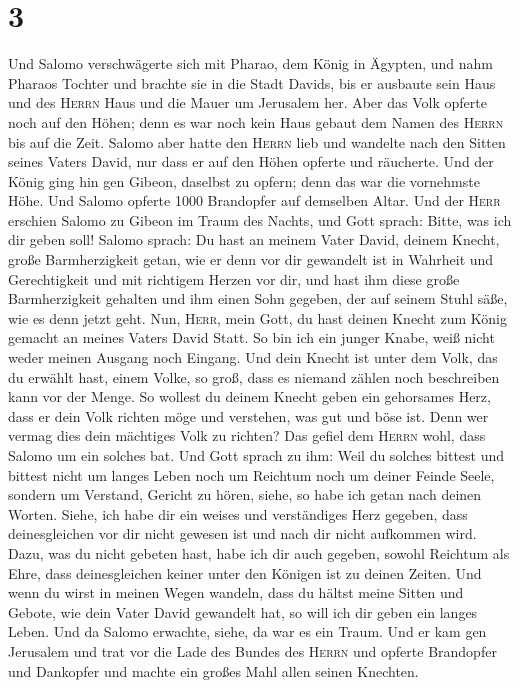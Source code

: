 \hypertarget{section-2}{%
\section{3}\label{section-2}}

 Und Salomo verschwägerte sich mit Pharao, dem König in
Ägypten, und nahm Pharaos Tochter und brachte sie in die Stadt Davids,
bis er ausbaute sein Haus und des \textsc{Herrn} Haus und die Mauer um
Jerusalem her.  Aber das Volk opferte noch auf den Höhen;
denn es war noch kein Haus gebaut dem Namen des \textsc{Herrn} bis auf
die Zeit.  Salomo aber hatte den \textsc{Herrn} lieb und
wandelte nach den Sitten seines Vaters David, nur dass er auf den Höhen
opferte und räucherte.  Und der König ging hin gen Gibeon,
daselbst zu opfern; denn das war die vornehmste Höhe. Und Salomo opferte
1000 Brandopfer auf demselben Altar.  Und der
\textsc{Herr} erschien Salomo zu Gibeon im Traum des Nachts, und Gott
sprach: Bitte, was ich dir geben soll!  Salomo sprach: Du
hast an meinem Vater David, deinem Knecht, große Barmherzigkeit getan,
wie er denn vor dir gewandelt ist in Wahrheit und Gerechtigkeit und mit
richtigem Herzen vor dir, und hast ihm diese große Barmherzigkeit
gehalten und ihm einen Sohn gegeben, der auf seinem Stuhl säße, wie es
denn jetzt geht.  Nun, \textsc{Herr}, mein Gott, du hast
deinen Knecht zum König gemacht an meines Vaters David Statt. So bin ich
ein junger Knabe, weiß nicht weder meinen Ausgang noch Eingang.
 Und dein Knecht ist unter dem Volk, das du erwählt hast,
einem Volke, so groß, dass es niemand zählen noch beschreiben kann vor
der Menge.  So wollest du deinem Knecht geben ein
gehorsames Herz, dass er dein Volk richten möge und verstehen, was gut
und böse ist. Denn wer vermag dies dein mächtiges Volk zu richten?
 Das gefiel dem \textsc{Herrn} wohl, dass Salomo um ein
solches bat.  Und Gott sprach zu ihm: Weil du solches
bittest und bittest nicht um langes Leben noch um Reichtum noch um
deiner Feinde Seele, sondern um Verstand, Gericht zu hören,
 siehe, so habe ich getan nach deinen Worten. Siehe, ich
habe dir ein weises und verständiges Herz gegeben, dass deinesgleichen
vor dir nicht gewesen ist und nach dir nicht aufkommen wird.
 Dazu, was du nicht gebeten hast, habe ich dir auch
gegeben, sowohl Reichtum als Ehre, dass deinesgleichen keiner unter den
Königen ist zu deinen Zeiten.  Und wenn du wirst in
meinen Wegen wandeln, dass du hältst meine Sitten und Gebote, wie dein
Vater David gewandelt hat, so will ich dir geben ein langes Leben.
 Und da Salomo erwachte, siehe, da war es ein Traum. Und
er kam gen Jerusalem und trat vor die Lade des Bundes des \textsc{Herrn}
und opferte Brandopfer und Dankopfer und machte ein großes Mahl allen
seinen Knechten.

